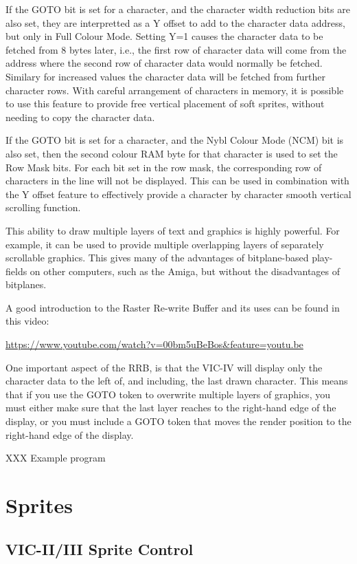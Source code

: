 If the GOTO bit is set for a character, and the character width reduction bits are also set, they are interpretted as a Y offset to add to the character data address, but only in Full Colour Mode.  Setting Y=1 causes the character data to be fetched from 8 bytes later, i.e., the first row of character data will come from the address where the second row of character data would normally be fetched.  Similary for increased values the character data will be fetched from further character rows.  With careful arrangement of characters in memory, it is possible to use this feature to provide free vertical placement of soft sprites, without needing to copy the character data.

If the GOTO bit is set for a character, and the Nybl Colour Mode (NCM) bit is also set, then the second colour RAM byte for that character is used to set the Row Mask bits. For each bit set in the row mask, the corresponding row of characters in the line will not be displayed. This can be used in combination with the Y offset feature to effectively provide a character by character smooth vertical scrolling function.

This ability to draw multiple layers of text and graphics is highly powerful. For example, it can be used to provide multiple overlapping
layers of separately scrollable graphics.  This gives many of the advantages of bitplane-based play-fields on other computers, such as the
Amiga, but without the disadvantages of bitplanes.

A good introduction to the Raster Re-write Buffer and its uses can be found in this video:

\url{https://www.youtube.com/watch?v=00bm5uBeBos&feature=youtu.be}

One important aspect of the RRB, is that the VIC-IV will display only the character data to the left of, and including, the last drawn character.  This means that if you use the GOTO token to overwrite multiple layers of graphics, you must either make sure that the last layer
reaches to the right-hand edge of the display, or you must include a GOTO token that moves the render position to the right-hand edge of the display.


XXX Example program

\section{Sprites}

\subsection{VIC-II/III Sprite Control}

